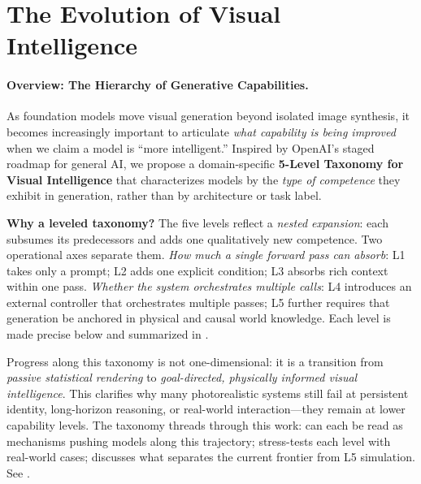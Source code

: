 \section{The Evolution of Visual Intelligence}
\label{sec:evolution}



\paragraph{Overview: The Hierarchy of Generative Capabilities.}

As foundation models move visual generation beyond isolated image synthesis, it becomes increasingly important to articulate \emph{what capability is being improved} when we claim a model is ``more intelligent.'' Inspired by OpenAI's staged roadmap for general AI, we propose a domain-specific \textbf{5-Level Taxonomy for Visual Intelligence} that characterizes models by the \emph{type of competence} they exhibit in generation, rather than by architecture or task label.

\textbf{Why a leveled taxonomy?} The five levels reflect a \emph{nested expansion}: each subsumes its predecessors and adds one qualitatively new competence. Two operational axes separate them. \emph{How much a single forward pass can absorb}: L1 takes only a prompt; L2 adds one explicit condition; L3 absorbs rich context within one pass. \emph{Whether the system orchestrates multiple calls}: L4 introduces an external controller that orchestrates multiple passes; L5 further requires that generation be anchored in physical and causal world knowledge. Each level is made precise below and summarized in .

Progress along this taxonomy is not one-dimensional: it is a transition from \emph{passive statistical rendering} to \emph{goal-directed, physically informed visual intelligence}. This clarifies why many photorealistic systems still fail at persistent identity, long-horizon reasoning, or real-world interaction---they remain at lower capability levels. The taxonomy threads through this work:  can each be read as mechanisms pushing models along this trajectory;  stress-tests each level with real-world cases;  discusses what separates the current frontier from L5 simulation. See .

